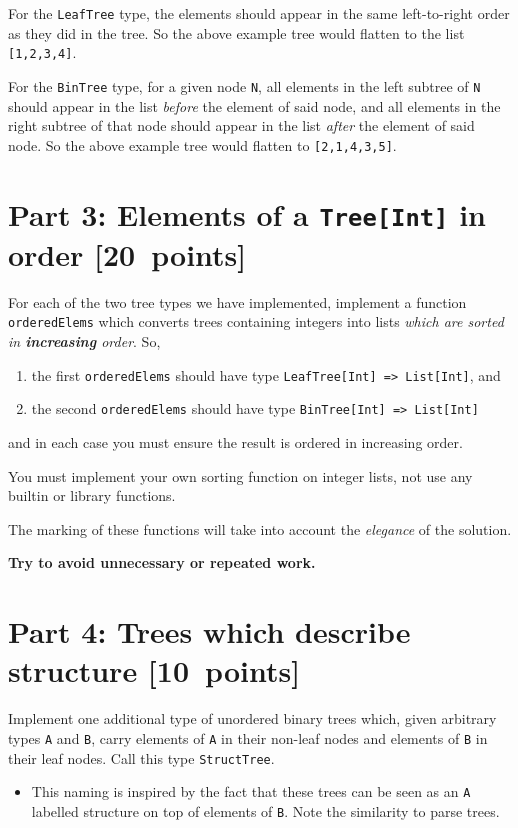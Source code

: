 \documentclass[11pt]{article}
\begin{document}
For the \texttt{LeafTree} type, the elements should appear in the same
left-to-right order as they did in the tree.
So the above example tree would flatten to the list \texttt{[1,2,3,4]}.

For the \texttt{BinTree} type, for a given node \texttt{N},
all elements in the left subtree of \texttt{N}
should appear in the list \emph{before} the element of said node, and
all elements in the right subtree of that node
should appear in the list \emph{after} the element of said node.
So the above example tree would flatten to \texttt{[2,1,4,3,5]}.

\section*{Part 3: Elements of a \texttt{Tree[Int]} in order   [20 points]}
\label{sec:org2dbb97c}
For each of the two tree types we have implemented, implement
a function \texttt{orderedElems} which converts trees containing integers
into lists \emph{which are sorted in \textbf{increasing} order}. So,
\begin{enumerate}
\item the first \texttt{orderedElems} should have type \texttt{LeafTree[Int] => List[Int]}, and
\item the second \texttt{orderedElems} should have type \texttt{BinTree[Int] => List[Int]}
\end{enumerate}
and in each case you must ensure the result is ordered
in increasing order.

You must implement your own sorting function on integer lists,
not use any builtin or library functions.

The marking of these functions will take into account
the \emph{elegance} of the solution.
\begin{center}
\textbf{Try to avoid unnecessary or repeated work.}
\end{center}

\section*{Part 4: Trees which describe structure     [10 points]}
\label{sec:org2078fd9}
Implement one additional type of unordered binary trees which,
given arbitrary types \texttt{A} and \texttt{B},
carry elements of \texttt{A} in their non-leaf nodes
and elements of \texttt{B} in their leaf nodes.
Call this type \texttt{StructTree}.
\begin{itemize}
\item This naming is inspired by the fact that these trees
can be seen as an \texttt{A} labelled structure
on top of elements of \texttt{B}.
Note the similarity to parse trees.
\end{itemize}
\end{document}
